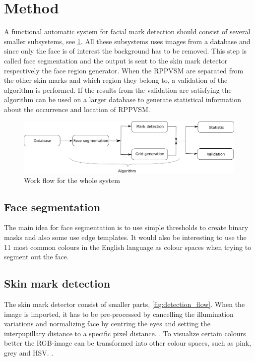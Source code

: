 \section{Method} \label{method}
A functional automatic system for facial mark detection should consist of several smaller subsystems, see \cref{fig:system_flow}. All these subsystems uses images from a database and since only the face is of interest the background has to be removed. This step is called face segmentation and the output is sent to the skin mark detector respectively the face region generator. When the RPPVSM are separated from the other skin marks and which region they belong to, a validation of the algorithm is performed. If the results from the validation are satisfying the algorithm can be used on a larger database to generate statistical information about the occurrence and location of RPPVSM.  

\begin{figure}[H]
	\centering
	\includegraphics[width=1.0\linewidth]{"bilder/system_flow"}
	\caption{Work flow for the whole system}
	\label{fig:system_flow}
\end{figure}

\subsection{Face segmentation}

The main idea for face segmentation is to use simple thresholds to create binary masks and also some use edge templates. \cite{face_segmentation_skin} It would also be interesting to use the 11 most common colours in the English language as colour spaces when trying to segment out the face. \cite{11_colours}  

\subsection{Skin mark detection}

The skin mark detector consist of smaller parts, \cref{fig:detection_flow}. When the image is imported, it has to be pre-processed by cancelling the illumination variations and normalizing face by centring the eyes and setting the interpupillary distance to a specific pixel distance. \cite{automatic_detector_2015}. To visualize certain colours better the RGB-image can be transformed into other colour spaces, such as pink, grey and HSV. \cite{11_colours}. 

